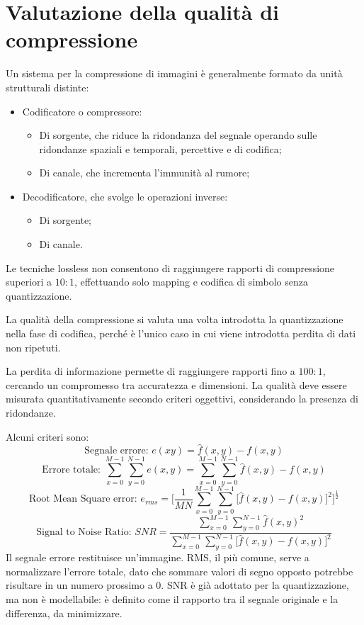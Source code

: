 \section{Valutazione della qualità di compressione}
Un sistema per la compressione di immagini è generalmente formato da unità strutturali distinte:
\begin{itemize}
	\item Codificatore o compressore:
	\begin{itemize}
		\item Di sorgente, che riduce la ridondanza del segnale operando sulle ridondanze spaziali e temporali, percettive e di codifica;
		\item Di canale, che incrementa l'immunità al rumore;
	\end{itemize}
	\item Decodificatore, che svolge le operazioni inverse:
	\begin{itemize}
		\item Di sorgente;
		\item Di canale.
	\end{itemize}
\end{itemize}

Le tecniche lossless non consentono di raggiungere rapporti di compressione superiori a $10 : 1$, effettuando solo mapping e codifica di simbolo senza quantizzazione.

La qualità della compressione si valuta una volta introdotta la quantizzazione nella fase di codifica, perché è l'unico caso in cui viene introdotta perdita di dati non ripetuti. 

La perdita di informazione permette di raggiungere rapporti fino a $100 : 1$, cercando un compromesso tra accuratezza e dimensioni. La qualità deve essere misurata quantitativamente secondo criteri oggettivi, considerando la presenza di ridondanze. 

Alcuni criteri sono:
$$\text{Segnale errore: } e(x y) = \hat{f}(x, y) - f(x, y)$$
$$\text{Errore totale: } \sum_{x=0}^{M-1} \sum_{y=0}^{N-1} e(x, y) = \sum_{x=0}^{M-1} \sum_{y=0}^{N-1} \hat{f}(x, y) - f(x, y)$$
$$\text{Root Mean Square error: } e_{rms} = \bigg[ \frac{1}{MN} \sum_{x=0}^{M-1} \sum_{y=0}^{N-1} \big[\hat{f}(x, y) - f(x, y)\big]^2\bigg]^{\frac{1}{2}}$$
$$\text{Signal to Noise Ratio: } SNR = \frac{\sum_{x=0}^{M-1} \sum_{y=0}^{N-1} \hat{f}(x, y)^2}{\sum_{x=0}^{M-1} \sum_{y=0}^{N-1} \big[\hat{f}(x, y) - f(x, y)\big]^2}$$
Il segnale errore restituisce un'immagine. RMS, il più comune, serve a normalizzare l'errore totale, dato che sommare valori di segno opposto potrebbe risultare in un numero prossimo a 0. SNR è già adottato per la quantizzazione, ma non è modellabile: è definito come il rapporto tra il segnale originale e la differenza, da minimizzare.

